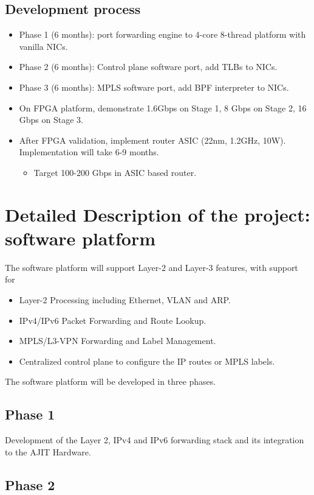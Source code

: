 \documentclass{article}
\begin{document}
\subsection{Development process}

\begin{itemize}
\item Phase 1 (6 months):  port forwarding engine to 4-core 8-thread platform with vanilla NICs.
\item Phase 2 (6 months):  Control plane software port, add TLBs to NICs.
\item Phase 3 (6 months):  MPLS software port, add BPF interpreter to NICs.
\item On FPGA platform, demonstrate 1.6Gbps on Stage 1, 8 Gbps on Stage 2, 16 Gbps on Stage 3.
\item After FPGA validation, implement router ASIC (22nm, 1.2GHz, 10W).  Implementation will take 6-9 months.
\begin{itemize}
\item Target 100-200 Gbps in ASIC based router.
\end{itemize}
\end{itemize}

\section{Detailed Description of the project: software platform}

The software platform will support Layer-2 and Layer-3 features, with support for
\begin{itemize}
\item Layer-2 Processing including Ethernet, VLAN and ARP.
\item IPv4/IPv6 Packet Forwarding and Route Lookup.
\item MPLS/L3-VPN Forwarding and Label Management.
\item Centralized control plane to configure the IP routes or MPLS labels.
\end{itemize}

The software platform will be developed in three phases.

\subsection{Phase 1}

Development of the Layer 2, IPv4 and IPv6 forwarding stack and its integration to the AJIT Hardware. 

\subsection{Phase 2}
\end{document}
